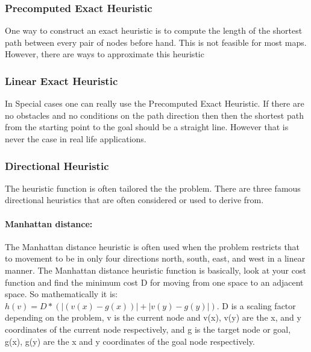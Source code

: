 \documentclass[12pt]{article}
\begin{document}
\subsubsection{Precomputed Exact Heuristic}
One way to construct an exact heuristic is to compute the length of the shortest path between every pair of nodes before hand. This is not feasible for most maps. However, there are ways to approximate this heuristic

\subsubsection{Linear Exact Heuristic}
In Special cases one can really use the Precomputed Exact Heuristic. If there are no obstacles and no conditions on the path direction then then the shortest path from the starting point to the goal should be a straight line. However that is never the case in real life applications.

\subsubsection{Directional Heuristic}
The heuristic function is often tailored the the problem. There are three famous directional heuristics that are often considered or used to derive from.

\paragraph{Manhattan distance: }
 The Manhattan distance heuristic is often used when the problem restricts that to movement to be in only four directions north, south, east, and west in a linear manner. The Manhattan distance heuristic function is basically, look at your cost function and find the minimum cost D for moving from one space to an adjacent space. So mathematically it is: \begin{math} h(v) = D*(|(v(x) - g(x))| + |v(y) - g(y)|)\end{math}. D is a scaling factor depending on the problem, v is the current node and v(x), v(y) are the x, and y coordinates of the current node respectively, and g is the target node or goal, g(x), g(y) are the x and y coordinates of the goal node respectively.
\end{document}
